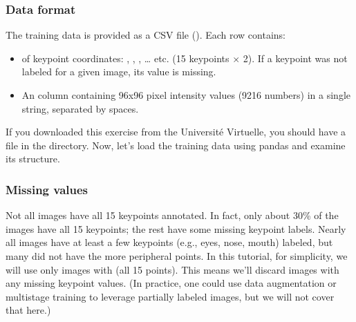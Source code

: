 \documentclass[letterpaper,10pt,english]{jupyterBook}
\begin{document}
\subsubsection{Data format}
\label{\detokenize{04:data-format}}
\sphinxAtStartPar
The training data is provided as a CSV file (). Each row contains:
\begin{itemize}
\item {} 
\sphinxAtStartPar
{} of keypoint coordinates: , , , … etc. (15 keypoints \(\times\) 2). If a keypoint was not labeled for a given image, its value is missing.

\item {} 
\sphinxAtStartPar
An  column containing 96x96 pixel intensity values (9216 numbers) in a single string, separated by spaces.

\end{itemize}

\sphinxAtStartPar
If you downloaded this exercise from the Université Virtuelle, you should have a  file in the  directory. Now, let’s load the training data using pandas and examine its structure.


\subsubsection{Missing values}
\label{\detokenize{04:missing-values}}
\sphinxAtStartPar
Not all images have all 15 keypoints annotated. In fact, only about 30\% of the images have all 15 keypoints; the rest have some missing keypoint labels. Nearly all images have at least a few keypoints (e.g., eyes, nose, mouth) labeled, but many did not have the more peripheral points. In this tutorial, for simplicity, we will use only images with  (all 15 points). This means we’ll discard images with any missing keypoint values. (In practice, one could use data augmentation or multi\sphinxhyphen{}stage training to leverage partially labeled images, but we will not cover that here.)
\end{document}
